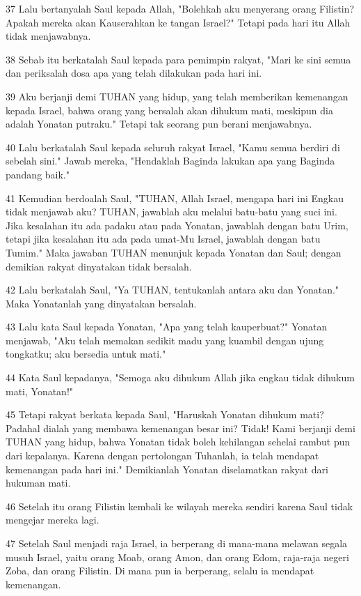 \par 37 Lalu bertanyalah Saul kepada Allah, "Bolehkah aku menyerang orang Filistin? Apakah mereka akan Kauserahkan ke tangan Israel?" Tetapi pada hari itu Allah tidak menjawabnya.
\par 38 Sebab itu berkatalah Saul kepada para pemimpin rakyat, "Mari ke sini semua dan periksalah dosa apa yang telah dilakukan pada hari ini.
\par 39 Aku berjanji demi TUHAN yang hidup, yang telah memberikan kemenangan kepada Israel, bahwa orang yang bersalah akan dihukum mati, meskipun dia adalah Yonatan putraku." Tetapi tak seorang pun berani menjawabnya.
\par 40 Lalu berkatalah Saul kepada seluruh rakyat Israel, "Kamu semua berdiri di sebelah sini." Jawab mereka, "Hendaklah Baginda lakukan apa yang Baginda pandang baik."
\par 41 Kemudian berdoalah Saul, "TUHAN, Allah Israel, mengapa hari ini Engkau tidak menjawab aku? TUHAN, jawablah aku melalui batu-batu yang suci ini. Jika kesalahan itu ada padaku atau pada Yonatan, jawablah dengan batu Urim, tetapi jika kesalahan itu ada pada umat-Mu Israel, jawablah dengan batu Tumim." Maka jawaban TUHAN menunjuk kepada Yonatan dan Saul; dengan demikian rakyat dinyatakan tidak bersalah.
\par 42 Lalu berkatalah Saul, "Ya TUHAN, tentukanlah antara aku dan Yonatan." Maka Yonatanlah yang dinyatakan bersalah.
\par 43 Lalu kata Saul kepada Yonatan, "Apa yang telah kauperbuat?" Yonatan menjawab, "Aku telah memakan sedikit madu yang kuambil dengan ujung tongkatku; aku bersedia untuk mati."
\par 44 Kata Saul kepadanya, "Semoga aku dihukum Allah jika engkau tidak dihukum mati, Yonatan!"
\par 45 Tetapi rakyat berkata kepada Saul, "Haruskah Yonatan dihukum mati? Padahal dialah yang membawa kemenangan besar ini? Tidak! Kami berjanji demi TUHAN yang hidup, bahwa Yonatan tidak boleh kehilangan sehelai rambut pun dari kepalanya. Karena dengan pertolongan Tuhanlah, ia telah mendapat kemenangan pada hari ini." Demikianlah Yonatan diselamatkan rakyat dari hukuman mati.
\par 46 Setelah itu orang Filistin kembali ke wilayah mereka sendiri karena Saul tidak mengejar mereka lagi.
\par 47 Setelah Saul menjadi raja Israel, ia berperang di mana-mana melawan segala musuh Israel, yaitu orang Moab, orang Amon, dan orang Edom, raja-raja negeri Zoba, dan orang Filistin. Di mana pun ia berperang, selalu ia mendapat kemenangan.
